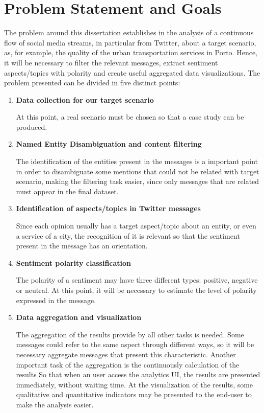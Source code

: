 \section{Problem Statement and Goals} \label{sec:problemstatement_goals}
The problem around this dissertation establishes in the analysis of a continuous flow of social media streams, in particular from Twitter, about a target scenario, as, for example, the quality of the urban transportation services in Porto. Hence, it will be necessary to filter the relevant messages, extract sentiment aspects/topics with polarity and create useful aggregated data visualizations. The problem presented can be divided in five distinct points:

\begin{enumerate}
\item \textbf{Data collection for our target scenario}

At this point, a real scenario must be chosen so that a case study can be produced.

\item \textbf{Named Entity Disambiguation and content filtering}

The identification of the entities present in the messages is a important point in order to disambiguate some mentions that could not be related with target scenario, making the filtering task easier, since only messages that are related must appear in the final dataset.

\item \textbf{Identification of aspects/topics in Twitter messages}

Since each opinion usually has a target aspect/topic about an entity, or even a service of a city, the recognition of it is relevant so that the sentiment present in the message has an orientation.

\item \textbf{Sentiment polarity classification}

The polarity of a sentiment may have three different types: positive, negative or neutral. At this point, it will be necessary to estimate the level of polarity expressed in the message.

\item \textbf{Data aggregation and visualization}

The aggregation of the results provide by all other tasks is needed. Some messages could refer to the same aspect through different ways, so it will be  necessary aggregate messages that present this characteristic. Another important task of the aggregation is the continuously calculation of the results So that when an user access the analytics UI, the results are presented immediately, without waiting time. At the visualization of the results, some qualitative and quantitative indicators may be presented to the end-user to make the analysis easier.

\end{enumerate}

